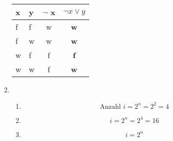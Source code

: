 \documentclass[a4paper]{article}
\begin{document}
\begin{enumerate}
		\begin{tabular}{|l|l|c|c|}
			\firsthline
			x & y & $\lnot$ x & $\lnot x \lor y$ \\
			\hline
			f & f & w & \textbf{w} \\
			f & w & w & \textbf{w} \\
			w & f & f & \textbf{f} \\
			w & w & f & \textbf{w} \\
			\hline
		\end{tabular}
		
		\item
		\begin{enumerate}
			\item
			\begin{equation*}
				\text{Anzahl } i = 2^{n} = 2^{2} = 4
			\end{equation*}
			
			\item
			\begin{equation*}
				i = 2^{n} = 2^{4} = 16
			\end{equation*}
			
			\item
			\begin{equation*}
				i = 2^{n}
			\end{equation*}
		\end{enumerate}
		

\end{enumerate}
\end{document}
